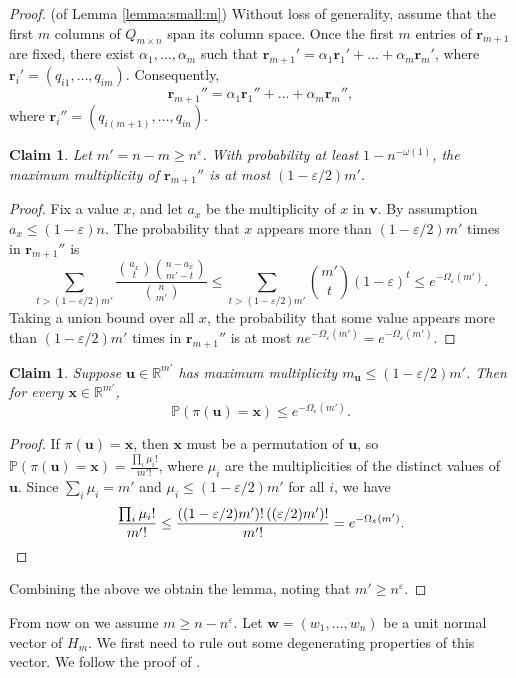 \documentclass[reqno]{amsart}
\newcommand\R{{\mathbb{R}}}
\renewcommand\P{{\mathbb{P}}}
\newcommand\eps{{\varepsilon}}
\newcommand\BMr{{\bm r}}
\newcommand\BMu{{\bm u}}
\newcommand\BMv{{\bm v}}
\newcommand\BMw{{\bm w}}
\newcommand\BMx{{\bm x}}
\newcommand\al{\alpha}
\theoremstyle{plain}
\newtheorem{claim}[theorem]{Claim}
\theoremstyle{definition}
\begin{document}
\begin{proof}(of Lemma \ref{lemma:small:m}) Without loss of generality, assume that the first $m$ columns of $Q_{m\times n}$
span its column space. Once the first $m$ entries of $\BMr_{m+1}$ are fixed,
there exist $\alpha_1,\dots,\alpha_m$ such that $\BMr_{m+1}'=\al_{1}\BMr_{1}'+\dots + \al_{m}\BMr_{m}'$, where $\BMr_{i}'=(q_{i1},\dots, q_{im})$. Consequently, 
\[
\BMr_{m+1}''=\al_{1}\BMr_{1}''+\dots + \al_{m}\BMr_{m}'',
\]
where $\BMr_{i}''=(q_{i(m+1)},\dots, q_{in})$.

\begin{claim} Let $m' = n-m \ge n^{\eps}$. With probability at least $1-n^{-\omega(1)}$, the maximum multiplicity
of $\BMr_{m+1}''$ is at most $(1-\eps/2)m'$.
\end{claim}
\begin{proof}
Fix a value $x$, and let $a_x$ be the multiplicity of $x$ in $\BMv$. By assumption
$a_x\le (1-\eps)n$. The probability that $x$ appears more than $(1-\eps/2)m'$
times in $\BMr_{m+1}''$ is
\[
\sum_{t>(1-\eps/2)m'}
\frac{\binom{a_x}{t}\binom{n-a_x}{m'-t}}{\binom{n}{m'}}
\le
\sum_{t>(1-\eps/2)m'} \binom{m'}{t}(1-\eps)^t
\le e^{-\Omega_\eps(m')}.
\]
Taking a union bound over all $x$, the probability that some value appears more
than $(1-\eps/2)m'$ times in $\BMr_{m+1}''$ is at most
$n e^{-\Omega_\eps(m')}=e^{-\Omega_\eps(m')}$.
\end{proof}

\begin{claim}
Suppose $\BMu\in\R^{m'}$ has maximum multiplicity
$m_{\BMu}\le (1-\eps/2)m'$. Then for every $\BMx\in\R^{m'}$,
\[
\P(\pi(\BMu)=\BMx)\le e^{-\Omega_{\eps}(m')}.
\]
\end{claim}

\begin{proof}
If $\pi(\BMu)=\BMx$, then $\BMx$ must be a permutation of $\BMu$, so
$\P(\pi(\BMu)=\BMx)=\frac{\prod_i \mu_i!}{m'!}$, where $\mu_i$ are the multiplicities
of the distinct values of $\BMu$. Since $\sum_i \mu_i=m'$ and
$\mu_i\le (1-\eps/2)m'$ for all $i$, we have
\[
\frac{\prod_i \mu_i!}{m'!}\le
\frac{((1-\eps/2)m')!\,((\eps/2)m')!}{m'!}
= e^{-\Omega_\eps(m')}. \qedhere
\]
\end{proof}

Combining the above we obtain the lemma, noting that $m'\ge n^{\eps}$.
\end{proof}

From now on we assume $m \ge n - n^{\eps}$. Let $\BMw=(w_{1},\dots, w_{n})$ be a unit normal vector of $H_{m}$. We first need to rule out some degenerating properties of this vector. We follow the proof of \cite[Lemma 4.3]{Nguyen}. 
\end{document}
